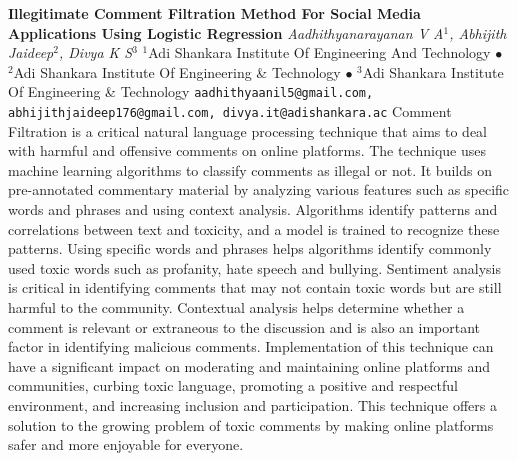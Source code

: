
    \begin{conf-abstract}[]
        {\textbf{Illegitimate Comment Filtration Method For Social Media Applications Using Logistic Regression }}
        {\textit{Aadhithyanarayanan V A$^{1}$, Abhijith Jaideep$^{2}$, Divya K S$^{3}$}}
        {$^{1}$Adi Shankara Institute Of Engineering And Technology $\bullet$ $^{2}$Adi Shankara Institute Of Engineering  \& Technology $\bullet$ $^{3}$Adi Shankara Institute Of Engineering  \& Technology}
        {\texttt{aadhithyaanil5@gmail.com, abhijithjaideep176@gmail.com, divya.it@adishankara.ac}}
        {Comment Filtration is a critical natural language processing technique that aims to deal with harmful and offensive comments on online platforms. The technique uses machine learning algorithms to classify comments as illegal or not. It builds on pre-annotated commentary material by analyzing various features such as specific words and phrases and using context analysis. Algorithms identify patterns and correlations between text and toxicity, and a model is trained to recognize these patterns. Using specific words and phrases helps algorithms identify commonly used toxic words such as profanity, hate speech and bullying. Sentiment analysis is critical in identifying comments that may not contain toxic words but are still harmful to the community. Contextual analysis helps determine whether a comment is relevant or extraneous to the discussion and is also an important factor in identifying malicious comments. Implementation of this technique can have a significant impact on moderating and maintaining online platforms and communities, curbing toxic language, promoting a positive and respectful environment, and increasing inclusion and participation. This technique offers a solution to the growing problem of toxic comments by making online platforms safer and more enjoyable for everyone.}
    \end{conf-abstract}
        